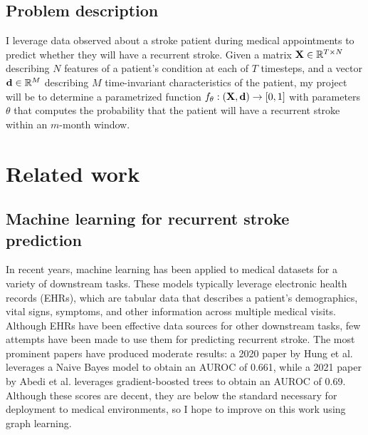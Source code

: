 \documentclass{article}
\begin{document}
\subsection{Problem description}

I leverage data observed about a stroke patient during medical appointments to predict whether they will have a recurrent stroke. Given a matrix $\bold{X} \in \mathbb{R}^{T \times N}$ describing $N$ features of a patient's condition at each of $T$ timesteps, and a vector $\bold{d} \in \mathbb{R}^M$ describing $M$ time-invariant characteristics of the patient, my project will be to determine a parametrized function $f_\theta : (\bold{X}, \bold{d}) \rightarrow \left[0, 1\right]$ with parameters $\theta$ that computes the probability that the patient will have a recurrent stroke within an $m$-month window. 

\section{Related work}
\subsection{Machine learning for recurrent stroke prediction}
In recent years, machine learning has been applied to medical datasets for a variety of downstream tasks. These models typically leverage electronic health records (EHRs), which are tabular data that describes a patient's demographics, vital signs, symptoms, and other information across multiple medical visits. Although EHRs have been effective data sources for other downstream tasks, few attempts have been made to use them for predicting recurrent stroke. The most prominent papers have produced moderate results: a 2020 paper by Hung et al. leverages a Naive Bayes model to obtain an AUROC of 0.661, while a 2021 paper by Abedi et al. leverages gradient-boosted trees to obtain an AUROC of 0.69. Although these scores are decent, they are below the standard necessary for deployment to medical environments, so I hope to improve on this work using graph learning.
\end{document}
